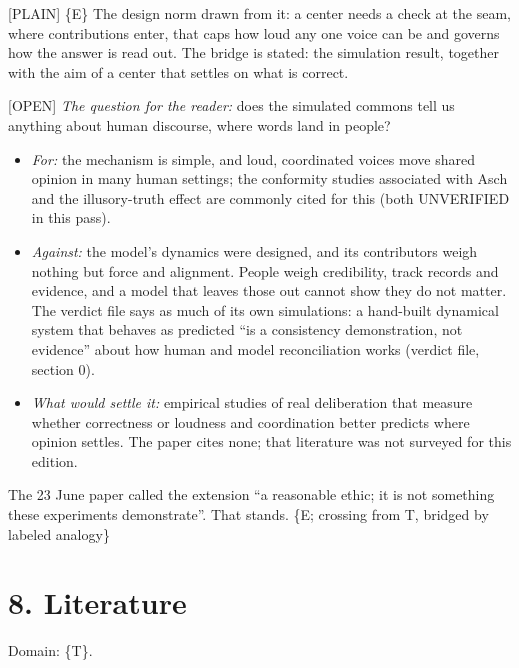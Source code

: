 \documentclass[11pt]{article}
\newcommand{\register}[1]{{\ttfamily\small #1}}
\begin{document}
\register{[PLAIN]} \{E\} The design norm drawn from it: a center needs a check at the seam, where contributions enter, that caps how loud any one voice can be and governs how the answer is read out. The bridge is stated: the simulation result, together with the aim of a center that settles on what is correct.

\register{[OPEN]} \emph{The question for the reader:} does the simulated commons tell us anything about human discourse, where words land in people?

\begin{itemize}
\item \emph{For:} the mechanism is simple, and loud, coordinated voices move shared opinion in many human settings; the conformity studies associated with Asch and the illusory-truth effect are commonly cited for this (both UNVERIFIED in this pass).
\item \emph{Against:} the model's dynamics were designed, and its contributors weigh nothing but force and alignment. People weigh credibility, track records and evidence, and a model that leaves those out cannot show they do not matter. The verdict file says as much of its own simulations: a hand-built dynamical system that behaves as predicted ``is a consistency demonstration, not evidence'' about how human and model reconciliation works (verdict file, section 0).
\item \emph{What would settle it:} empirical studies of real deliberation that measure whether correctness or loudness and coordination better predicts where opinion settles. The paper cites none; that literature was not surveyed for this edition.
\end{itemize}
The 23 June paper called the extension ``a reasonable ethic; it is not something these experiments demonstrate''. That stands. \{E; crossing from T, bridged by labeled analogy\}

\section*{8. Literature}

Domain: \{T\}.
\end{document}
